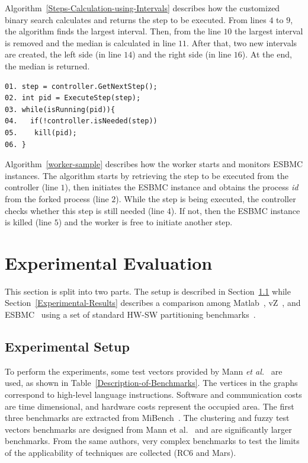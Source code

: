 Algorithm~\ref{Steps-Calculation-using-Intervals} describes how the customized binary search calculates and returns the step to be executed. From lines $4$ to $9$, the algorithm finds the largest interval. Then, from the line $10$ the largest interval is removed and the median is calculated in line $11$. After that, two new intervals are created, the left side (in line $14$) and the right side (in line $16$). At the end, the median is returned.

\begin{lstlisting}[caption=Worker sample,label=worker-sample]
01. step = controller.GetNextStep();
02. int pid = ExecuteStep(step);
03. while(isRunning(pid)){
04.   if(!controller.isNeeded(step))
05.    kill(pid);
06. }     
\end{lstlisting}

Algorithm~\ref{worker-sample} describes how the worker starts and monitors ESBMC instances. The algorithm starts by retrieving the step to be executed from the controller (line $1$), then initiates the ESBMC instance and obtains the process \textit{id} from the forked process (line $2$). While the step is being executed, the controller checks whether this step is still needed (line $4$). If not, then the ESBMC instance is killed (line $5$) and the worker is free to initiate another step.


\section{Experimental Evaluation}
\label{Experimental-Evaluation}

This section is split into two parts. The setup is described in Section~\ref{Experimental-Setup} while Section~\ref{Experimental-Results} describes a comparison among Matlab~\cite{TheMathWorks2013}, vZ~\cite{Bjorner2015}, and ESBMC~\cite{Trindade2015} using a set of standard HW-SW partitioning benchmarks~\cite{Mann2007}.

\subsection{Experimental Setup}
\label{Experimental-Setup}

To perform the experiments, some test vectors provided by Mann {\it et al.}~\cite{Mann2007} are used, as shown in Table~\ref{Description-of-Benchmarks}. The vertices in the graphs correspond to high-level language instructions. Software and communication costs are time dimensional, and hardware costs represent the occupied area. The first three benchmarks are extracted from MiBench~\cite{Guthaus2001}. The clustering and fuzzy test vectors benchmarks are designed from Mann et al.~\cite{Mann2007} and are significantly larger benchmarks. From the same authors,  very complex benchmarks to test the limits of the applicability of techniques are collected (RC$6$ and Mars).

